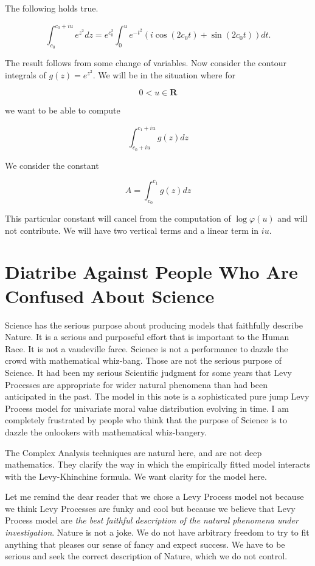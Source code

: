 \documentclass{amsart}
\begin{document}
\begin{proposition}

The following holds true.

\begin{equation}
\int_{c_0}^{c_0+iu} e^{z^2} dz =
 e^{c_0^2} \int_{0}^{u} e^{-t^2}( i \cos(2 c_0 t) + \sin( 2c_0 t))dt.
\end{equation}
\end{proposition}

The result follows from some change of variables. Now consider the contour integrals of $g(z) = e^{z^2}$.  We will be in the situation where for 

$$0< u \in \mathbf{R}
$$

we want to be able to compute

\[
\int_{c_0+iu}^{c_1+iu} g(z) dz
\]

We consider the constant

\[
A = \int_{c_0}^{c_1} g(z) dz
\]

This particular constant will cancel from the computation of $\log \varphi(u)$ and will not contribute.  We will have two vertical terms and a linear term in $iu$.

\section{Diatribe Against People Who Are Confused About Science}

Science has the serious purpose about producing models that faithfully describe Nature.  It is a serious and purposeful effort that is important to the Human Race.  It is not a vaudeville farce.  Science is not a performance to dazzle the crowd with mathematical whiz-bang.  Those are not the serious purpose of Science.  It had been my serious Scientific judgment for some years that Levy Processes are appropriate for wider natural phenomena than had been anticipated in the past.  The model in this note is a sophisticated pure jump Levy Process model for univariate moral value distribution evolving in time.  I am completely frustrated by people who think that the purpose of Science is to dazzle the onlookers with mathematical whiz-bangery.  

The Complex Analysis techniques are natural here, and are not deep mathematics.  They clarify the way in which the empirically fitted model interacts with the Levy-Khinchine formula.  We want clarity for the model here.

Let me remind the dear reader that we chose a Levy Process model not because we think Levy Processes are funky and cool but because we believe that Levy Process model are {\em the best faithful description of the natural phenomena under investigation}.  Nature is not a joke.  We do not have arbitrary freedom to try to fit anything that pleases our sense of fancy and expect success.  We have to be serious and seek the correct description of Nature, which we do not control.
\end{document}
